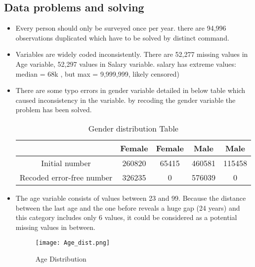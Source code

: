 \documentclass[12pt]{article}
\begin{document}
\subsection{Data problems and solving}
\begin{itemize}
    \item Every person should only be surveyed once per year. there are 94,996 observations duplicated which have to be solved by distinct command.
    \item Variables are widely coded inconsistently. There are 52,277 missing values in Age variable, 52,297 values in Salary variable. salary has extreme values: median = 68k , but max = 9,999,999, likely censored)

    \item There are some typo errors in gender variable detailed in below table which caused inconsistency in the variable. by recoding the gender variable the problem has been solved.
    
\begin{table}[H]
    \centering
    \label{tab:gender_dist}
    \begin{tabular}{|c|c|c|c|c|}
        \hline
         & Female & Female & Male & Male\\ \hline
        Initial number & 260820 &  65415 & 460581 & 115458 \\ \hline
        Recoded error-free number & 326235 & 0 & 576039 & 0 \\ \hline
    \end{tabular}
     \caption{Gender distribution Table}
\end{table}

    \item The age variable consists of values between 23 and 99. Because the distance between the last age and the one before reveals a huge gap (24 years) and this category includes only 6 values, it could be considered as a potential missing values in between.

\begin{figure}[h]
\centering
\texttt{[image: Age\_dist.png]}
\caption{Age Distribution}
\end{figure}    
    

\end{itemize}
\end{document}
